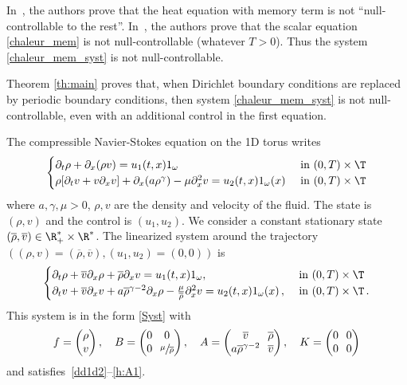 In~\cite{ivanov_2009}, the authors prove that the heat equation with memory term is not ``null-controllable to the rest''.
In~\cite{guerrero_2013}, the authors prove that the scalar equation \eqref{chaleur_mem} is not null-controllable (whatever $T>0$).
Thus the system \eqref{chaleur_mem_syst} is not null-controllable.

Theorem \ref{th:main} proves that, when Dirichlet boundary conditions are replaced by periodic boundary conditions, then system \eqref{chaleur_mem_syst} is not null-controllable, even with an additional control in the first equation.


The compressible Navier-Stokes equation on the 1D torus writes
\[
\begin{cases}
\partial_t \rho + \partial_x (\rho v) = u_1(t,x) 1_\omega \quad & \text{ in } (0,T)\times\T \\
\rho[\partial_t v + v \partial_x v ] + \partial_x(a \rho^\gamma)- \mu \partial_x^2v = u_2(t,x)1_\omega(x) & \text{ in } (0,T)\times\T
\end{cases}
\]
where $a,\gamma, \mu>0$, $\rho, v$ are the density and velocity of the fluid. The state is $(\rho,v)$ and the control is $(u_1,u_2)$. We consider a constant stationary state $(\overline{\rho},\overline{v}) \in \R^*_+ \times \R^*$. The linearized system around the trajectory $((\rho,v)=(\overline{\rho},\overline{v}),(u_1,u_2)=(0,0))$ is
\begin{equation} \label{NSCL}
\begin{cases}
\partial_t \rho + \overline{v} \partial_x \rho + \overline{\rho}\partial_x v = u_1(t,x) 1_\omega, \ & \text{ in } (0,T)\times\T
\\
\partial_t v + \overline{v} \partial_x v + a \overline{\rho}^{\gamma-2} \partial_x \rho - \frac{\mu}{\overline{\rho}} \partial_x^2 v = u_2(t,x)1_\omega(x)\,, & \text{ in } (0,T)\times\T\,.
\end{cases}
\end{equation}
This system is in the form \eqref{Syst} with
\[\arraycolsep3.5pt
f=\begin{pmatrix}
\rho \\ v
\end{pmatrix}, \quad
B=\begin{pmatrix}
0 & 0 \\ 0 & \sfrac{\mu}{\overline{\rho}}
\end{pmatrix}, \quad
A=\begin{pmatrix}
\overline{v} & \overline{\rho} \\ a \overline{\rho}^{\gamma-2} & \overline{v}
\end{pmatrix}, \quad
K=\begin{pmatrix}
0 & 0 \\ 0 & 0
\end{pmatrix}
\]
and satisfies~\eqref{dd1d2}--\eqref{h:A1}.

